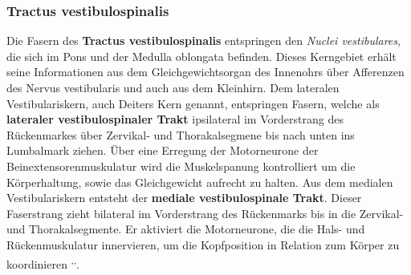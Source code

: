 \subsubsection{Tractus vestibulospinalis}  \label{subsubsec:vestibulospinalis}
Die Fasern des \textbf{Tractus vestibulospinalis} entspringen den \textit{Nuclei vestibulares}, die sich im Pons und der Medulla oblongata befinden. Dieses Kerngebiet erhält seine Informationen aus dem Gleichgewichtsorgan des Innenohrs über Afferenzen des Nervus vestibularis und auch aus dem Kleinhirn. Dem lateralen Vestibulariskern, auch Deiters Kern genannt, entspringen Fasern, welche als \textbf{lateraler vestibulospinaler Trakt} ipsilateral im Vorderstrang des Rückenmarkes über Zervikal- und Thorakalsegmene bis nach unten ins Lumbalmark ziehen. Über eine Erregung der Motorneurone der Beinextensorenmuskulatur wird die Muskelspanung kontrolliert um die Körperhaltung, sowie das Gleichgewicht aufrecht zu halten. Aus dem medialen Vestibulariskern entsteht der \textbf{mediale vestibulospinale Trakt}. Dieser Faserstrang zieht bilateral im Vorderstrang des Rückenmarks bis in die Zervikal- und Thorakalsegmente. Er aktiviert die Motorneurone, die die Hals- und Rückenmuskulatur innervieren, um die Kopfposition in Relation zum Körper zu koordinieren \textsuperscript{\cite[14]{neurowissenschaften_baer},\cite[9]{crossman2014neuroanatomy},\cite[8]{paxinos2014rat}}.  


